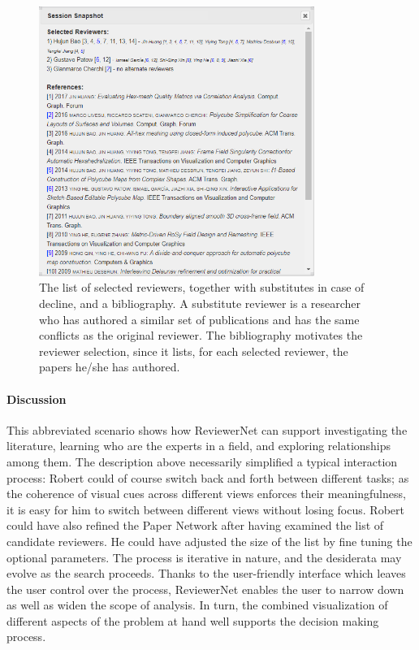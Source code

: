 \begin{figure}[!pt]
\centering
\includegraphics[width=0.8\textwidth]{fig/reviewers.png}
\caption{The list of selected reviewers, together with substitutes in case of decline, and a bibliography. A substitute reviewer is a researcher who has authored a similar set of publications and has the same conflicts as the original reviewer. The bibliography motivates the  reviewer selection, since it lists, for each selected reviewer, the papers he/she has authored.}%
\label{fig:list}
\end{figure}

 

\paragraph*{Discussion} 
This abbreviated scenario shows how ReviewerNet can support investigating the literature, learning who are the experts in a field, and exploring relationships among them. The description above necessarily simplified a typical interaction process: Robert could of course switch back and forth between different tasks; as the coherence of visual cues across different views enforces their meaningfulness, it is easy for him to switch between different views without losing focus. Robert could have also refined the Paper Network after having examined the list of candidate reviewers. He could have adjusted the size of the list by fine tuning the optional parameters. The process is iterative in nature, and the desiderata may evolve as the search proceeds. Thanks to the user-friendly interface which leaves the user control over the process, ReviewerNet enables the user to narrow down as well as widen the scope of analysis. In turn, the combined visualization of different aspects of the problem at hand well supports the decision making process.     
